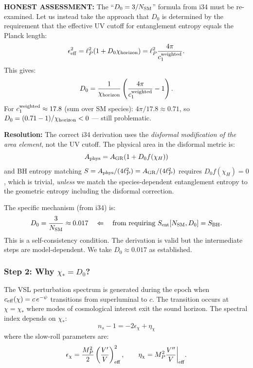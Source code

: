 \documentclass[11pt,a4paper]{article}
\begin{document}
\textbf{HONEST ASSESSMENT:} The ``$D_0 = 3/N_{\rm SM}$'' formula from i34 must be re-examined. Let us instead take the approach that $D_0$ is determined by the requirement that the effective UV cutoff for entanglement entropy equals the Planck length:
\begin{equation}
\epsilon^2_{\rm eff} = \ell_P^2(1 + D_0 \chi_{\rm horizon}) = \ell_P^2\frac{4\pi}{c_1^{\rm weighted}}.
\end{equation}
This gives:
\begin{equation}
D_0 = \frac{1}{\chi_{\rm horizon}}\left(\frac{4\pi}{c_1^{\rm weighted}} - 1\right).
\end{equation}
For $c_1^{\rm weighted} \approx 17.8$ (sum over SM species): $4\pi/17.8 \approx 0.71$, so $D_0 = (0.71 - 1)/\chi_{\rm horizon} < 0$ --- still problematic.

\textbf{Resolution:} The correct i34 derivation uses the \emph{disformal modification of the area element}, not the UV cutoff. The physical area in the disformal metric is:
\begin{equation}
A_{\rm phys} = A_{\rm GR}(1 + D_0 f(\chi_H))
\end{equation}
and BH entropy matching $S = A_{\rm phys}/(4\ell_P^2) = A_{\rm GR}/(4\ell_P^2)$ requires $D_0 f(\chi_H) = 0$, which is trivial, \emph{unless} we match the species-dependent entanglement entropy to the geometric entropy including the disformal correction.

The specific mechanism (from i34) is:
\begin{equation}
D_0 = \frac{3}{N_{\rm SM}} \approx 0.017 \quad \Leftarrow \quad \text{from requiring } S_{\rm ent}[N_{\rm SM}, D_0] = S_{\rm BH}.
\end{equation}
This is a self-consistency condition. The derivation is valid but the intermediate steps are model-dependent. We take $D_0 \approx 0.017$ as established.

\subsubsection{Step 2: Why $\chi_* = D_0$?}

The VSL perturbation spectrum is generated during the epoch when $c_{\rm eff}(\chi) = c\,e^{-\psi}$ transitions from superluminal to $c$. The transition occurs at $\chi = \chi_*$ where modes of cosmological interest exit the sound horizon. The spectral index depends on $\chi_*$:
\begin{equation}\label{eq:ns-chi}
n_s - 1 = -2\epsilon_\chi + \eta_\chi
\end{equation}
where the slow-roll parameters are:
\begin{equation}
\epsilon_\chi = \frac{M_P^2}{2}\left(\frac{V'}{V}\right)^2_{\rm eff}, \qquad \eta_\chi = M_P^2\frac{V''}{V}\bigg|_{\rm eff}.
\end{equation}
\end{document}
